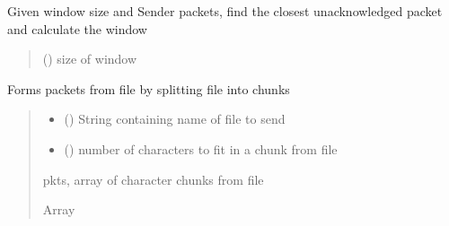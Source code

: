 \documentclass[letterpaper,10pt,oneside,english,openany]{sphinxmanual}
\begin{document}
\begin{fulllineitems}
\begin{fulllineitems}
\label{\detokenize{modules:sender_rdt.Sender.find_recv_base_window}}
\pysigstartsignatures
\pysiglinewithargsret
{}
{}
{}
\pysigstopsignatures
\sphinxAtStartPar
Given window size and Sender packets,
find the closest unacknowledged packet and calculate the window
\begin{quote}\begin{description}
\sphinxAtStartPar
{} () \textendash{} size of window

\end{description}\end{quote}

\end{fulllineitems}


\begin{fulllineitems}
\label{\detokenize{modules:sender_rdt.Sender.make_packets}}
\pysigstartsignatures
\pysiglinewithargsret
{}
{\sphinxparamcomma {}}
{}
\pysigstopsignatures
\sphinxAtStartPar
Forms packets from file by splitting file into chunks
\begin{quote}\begin{description}
\begin{itemize}
\item {} 
\sphinxAtStartPar
{} () \textendash{} String containing name of file to send

\item {} 
\sphinxAtStartPar
{} () \textendash{} number of characters to fit in a chunk from file

\end{itemize}

\sphinxAtStartPar
pkts, array of character chunks from file

\sphinxAtStartPar
Array


\end{description}
\end{quote}
\end{fulllineitems}
\end{fulllineitems}
\end{document}

